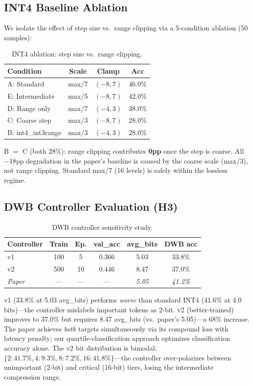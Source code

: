 \documentclass[10pt,twocolumn]{article}
\begin{document}
\subsection{INT4 Baseline Ablation}

We isolate the effect of step size vs.\ range clipping via a 5-condition
ablation (50 samples):

\begin{table}[h]
\centering
\caption{INT4 ablation: step size vs.\ range clipping.}
\label{tab:ablation}
\footnotesize
\begin{tabular}{lccc}
\toprule
Condition & Scale & Clamp & Acc \\
\midrule
A: Standard & max/7 & $(-8,7)$ & 46.0\% \\
E: Intermediate & max/5 & $(-8,7)$ & 42.0\% \\
D: Range only & max/7 & $(-4,3)$ & 38.0\% \\
C: Coarse step & max/3 & $(-8,7)$ & 28.0\% \\
B: int4\_int3range & max/3 & $(-4,3)$ & 28.0\% \\
\bottomrule
\end{tabular}
\end{table}

B $=$ C (both 28\%): range clipping contributes \textbf{0pp} once the
step is coarse.
All $-$18pp degradation in the paper's baseline is caused by the coarse
scale (max/3), not range clipping.
Standard max/7 (16 levels) is safely within the lossless regime.

\subsection{DWB Controller Evaluation (H3)}

\begin{table}[h]
\centering
\caption{DWB controller sensitivity study.}
\label{tab:dwb}
\footnotesize
\begin{tabular}{lccccc}
\toprule
Controller & Train & Ep. & val\_acc & avg\_bits & DWB acc \\
\midrule
v1 & 100 & 5 & 0.366 & 5.03 & 33.8\% \\
v2 & 500 & 10 & 0.446 & 8.47 & 37.0\% \\
\textit{Paper} & --- & --- & --- & \textit{5.05} & \textit{41.2\%} \\
\bottomrule
\end{tabular}
\end{table}

v1 (33.8\% at 5.03 avg\_bits) performs \emph{worse} than standard INT4
(41.6\% at 4.0 bits)—the controller mislabels important tokens as 2-bit.
v2 (better-trained) improves to 37.0\% but requires 8.47 avg\_bits (vs.\
paper's 5.05)—a 68\% increase.
The paper achieves \emph{both} targets simultaneously via its compound
loss with latency penalty; our quartile-classification approach
optimizes classification accuracy alone.
The v2 bit distribution is bimodal: $\{2: 41.7\%, 4: 9.3\%, 8: 7.2\%, 16: 41.8\%\}$—the controller
over-polarizes between unimportant (2-bit) and critical (16-bit) tiers,
losing the intermediate compression range.
\end{document}
